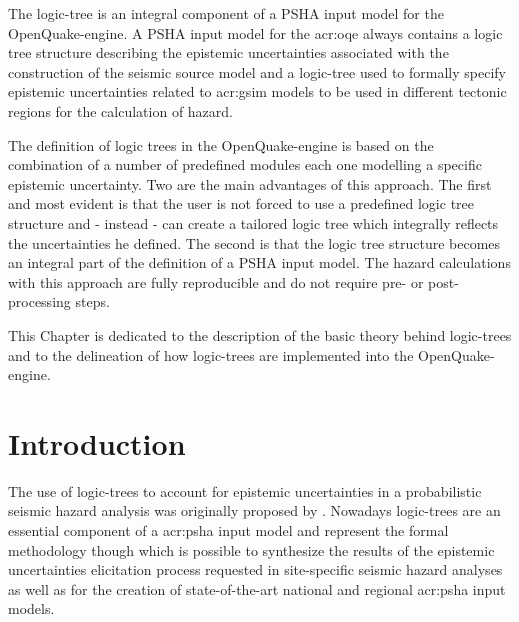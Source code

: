 %
The logic-tree is an integral component of a PSHA input model for the 
OpenQuake-engine. A PSHA input model for the \gls{acr:oqe} always 
contains a logic tree structure 
describing the epistemic uncertainties associated with the construction 
of the seismic source model and a logic-tree used to formally specify 
epistemic uncertainties related to \gls{acr:gsim} models to be used in 
different tectonic regions for the calculation of hazard.

The definition of logic trees in the OpenQuake-engine is based on
the combination of a number of predefined modules each one modelling a 
specific epistemic uncertainty. 
%
Two are the main advantages of this approach. The first and most evident  
is that the user is not forced to use a predefined logic tree structure and
- instead - can create a tailored logic tree which integrally 
reflects the uncertainties he defined. 
%
The second is that the logic tree structure becomes an integral part of the 
definition of a PSHA input model. The hazard calculations with this approach 
are fully reproducible and do not require pre- or post-processing steps.

This Chapter is dedicated to the description of the basic theory behind 
logic-trees and to the delineation of how logic-trees are implemented 
into the OpenQuake-engine.
%
\section{Introduction}
The use of logic-trees to account for epistemic uncertainties in a 
probabilistic seismic hazard analysis was originally proposed by 
\textcite{kulkarni84}.
%
Nowadays logic-trees are an essential component of a \gls{acr:psha} input
model and represent the formal methodology though which is possible to 
synthesize the results of the epistemic uncertainties elicitation process
requested in site-specific seismic hazard analyses \parencite{budnitz1997}
as well as for the creation of state\--of\--the\--art national and 
regional \gls{acr:psha} input models. 

